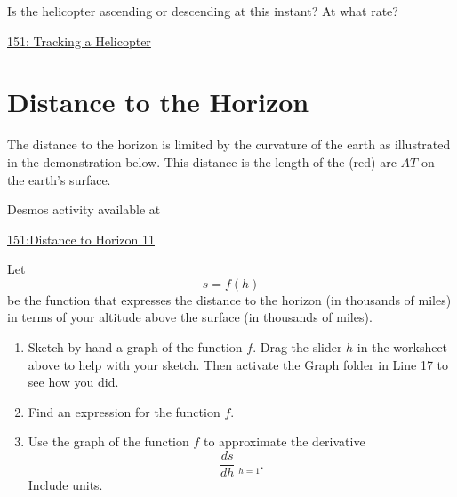\documentclass{ximera}
\begin{document}
Is the helicopter ascending or descending at this instant? At what rate?

 
\begin{onlineOnly}
   \begin{center}
\end{center}
\end{onlineOnly}

\href{https://www.desmos.com/calculator/xl8t3toppg}{151: Tracking a Helicopter}



\section{Distance to the Horizon}

\begin{question}  \label{Qthhvhrdfgbyt}
The distance to the horizon is limited by the curvature of the earth as illustrated in the demonstration below. This distance is the length of the (red) arc $AT$ on the earth's surface. 


 
\begin{onlineOnly}
    \begin{center}
\end{center}
\end{onlineOnly}

Desmos activity available at

\href{https://www.desmos.com/calculator/8qwt6mfirt}{151:Distance to Horizon 11}


Let 
\[
    s = f(h)
\]
be the function that expresses the distance to the horizon (in thousands of miles) in terms of your altitude above the surface (in thousands of miles).

\begin{enumerate}

\item Sketch by hand a graph of the function $f$. Drag the slider $h$ in the worksheet above to help with your sketch. Then activate the Graph folder in Line 17 to see how you did.

\item Find an expression for the function $f$.

\item Use the graph of the function $f$ to approximate the derivative
\[
       \frac{ds}{dh}\Big|_{h=1} .
\]
Include units.


\end{enumerate}
\end{question}
\end{document}
